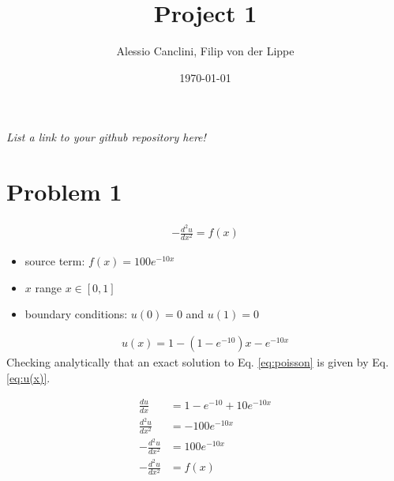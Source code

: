 \documentclass[english,notitlepage]{revtex4-1}  %
\begin{document}
\title{Project 1}      %
\author{Alessio Canclini, Filip von der Lippe}          %
\date{\today}                             %
\noaffiliation                            %


\maketitle

\textit{List a link to your github repository here!}

\section*{Problem 1}
\begin{align}
  - \frac{d^2u}{dx^2} = f(x)
  \label{eq:poisson}
\end{align}

\begin{itemize}
  \item source term: $f(x) = 100e^{-10x}$
  \item $x$ range $x \in [0,1]$
  \item boundary conditions: $u(0) = 0$ and $u(1) = 0$
\end{itemize}

\begin{align}
  u(x) = 1 - (1 - e^{-10})x- e^{-10x}
  \label{eq:u(x)}
\end{align}
Checking analytically that an exact solution to Eq. \ref{eq:poisson} is given by Eq. \ref{eq:u(x)}.

\begin{align*}
  \frac{du}{dx} & = 1 - e^{-10} + 10e^{-10x} \\
  \frac{d^2u}{dx^2} & = -100e^{-10x} \\
  -\frac{d^2u}{dx^2} & = 100e^{-10x} \\
  -\frac{d^2u}{dx^2} & = f(x)
\end{align*}
\end{document}
